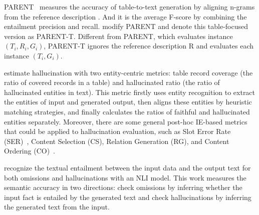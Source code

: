 PARENT~ measures the accuracy of table-to-text generation by aligning n-grams from the reference description . And it is the average F-score by combining the entailment precision and recall. 
 modify PARENT and denote this table-focused version as PARENT-T.  
Different from PARENT, which evaluates  instance $(T_i, R_i, G_i)$, PARENT-T ignores the reference description R and evaluates each instance $(T_i, G_i)$.

\vspace{-0.5em} 
 estimate hallucination with two entity-centric metrics: table record coverage (the ratio of covered records in a table) and hallucinated ratio (the ratio of hallucinated entities in text).
This metric firstly uses entity recognition to extract the entities of input and generated output,
then aligns these entities by heuristic matching strategies,
and finally calculates the ratios of faithful and hallucinated entities separately.
Moreover, there are some general post-hoc IE-based metrics that could be applied to hallucination evaluation, such as Slot Error Rate (SER)~, 
Content Selection (CS), Relation Generation (RG), and Content Ordering (CO)~.

\vspace{-0.5em} 

\vspace{-0.5em} 
 recognize the textual entailment between the input data and the output text for both omissions and hallucinations with an NLI model. This work measures the semantic accuracy in two directions: check omissions by inferring whether the input fact is entailed by the generated text and check hallucinations by inferring the generated text from the input.

